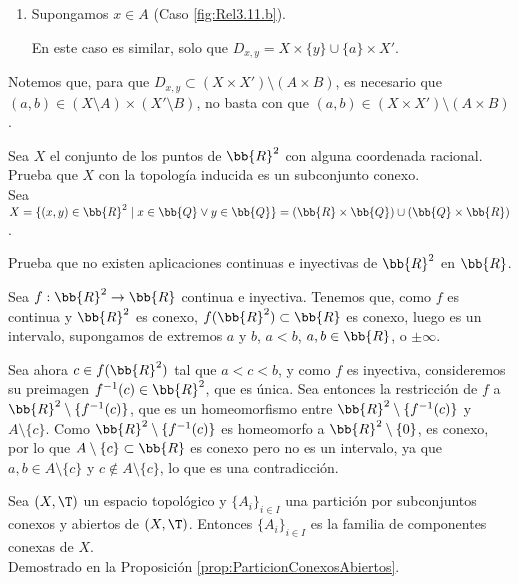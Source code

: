 \begin{ejercicio}
\begin{enumerate}
        \item Supongamos $x\in A$ (Caso \ref{fig:Rel3.11.b}).
        
        En este caso es similar, solo que $D_{x,y}=X\times \{y\} \cup \{a\}\times X'$.
    \end{enumerate}

    Notemos que, para que $D_{x,y}\subset (X \times X') \setminus (A \times B)$,
    es necesario que $(a,b)\in (X\setminus A) \times (X'\setminus B)$, no basta con
    que $(a,b)\in (X\times X') \setminus (A\times B)$.
\end{ejercicio}

\begin{ejercicio}
    Sea $X$ el conjunto de los puntos de $ \bb{R}^2 $ con alguna coordenada racional. Prueba que $X$ con la topología inducida es un subconjunto conexo.\\

    Sea $X=\{(x,y)\in \bb{R}^2 \mid x\in \bb{Q} \lor y\in \bb{Q}\}=(\bb{R}\times \bb{Q}) \cup (\bb{Q}\times \bb{R})$.
\end{ejercicio}

\begin{ejercicio}
    Prueba que no existen aplicaciones continuas e inyectivas de $\bb{R}^2$ en $\bb{R}$.

    Sea $f:\bb{R}^2\to \bb{R}$ continua e inyectiva. Tenemos que, como $f$ es continua y $\bb{R}^2$ es conexo, $f(\bb{R}^2)\subset \bb{R}$ es conexo, luego es un intervalo, supongamos de extremos
    $a$ y $b$, $a<b$, $a,b\in \bb{R}$, o $\pm \infty$.

    Sea ahora $c\in f(\bb{R}^2)$ tal que $a<c<b$, y como $f$ es inyectiva, consideremos su preimagen $f^{-1}(c)\in \bb{R}^2$, que es única.
    Sea entonces la restricción de $f$ a $\bb{R}^2\setminus \{f^{-1}(c)\}$,
    que es un homeomorfismo entre $\bb{R}^2\setminus \{f^{-1}(c)\}$ y $A\setminus \{c\}$. Como $\bb{R}^2\setminus \{f^{-1}(c)\}$ es homeomorfo a $\bb{R}^2\setminus \{0\}$, es conexo, por lo que
    $A\setminus \{c\}\subset \bb{R}$ es conexo pero no es un intervalo, ya que $a,b\in A\setminus \{c\}$ y $c\notin A\setminus \{c\}$, lo que es una contradicción.
\end{ejercicio}

\begin{ejercicio}
    Sea $(X, \T)$ un espacio topológico y $\{A_i\}_{i \in I}$ una partición por subconjuntos conexos y abiertos de $(X, \T)$. Entonces $\{A_i\}_{i \in I}$ es la familia de componentes conexas de $X$.\\

    Demostrado en la Proposición \ref{prop:ParticionConexosAbiertos}.
\end{ejercicio}



